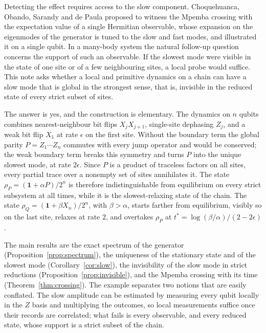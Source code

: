 \documentclass[11pt,a4paper]{article}
\theoremstyle{definition}
\theoremstyle{plain}
\newcommand{\one}{\mathbf{1}}
\begin{document}
Detecting the effect requires access to the slow component. Choquehuanca,
Obando, Sarandy and de Paula \cite{Choquehuanca2026} proposed to witness the
Mpemba crossing with the expectation value of a single Hermitian observable,
whose expansion on the eigenmodes of the generator is tuned to the slow and
fast modes, and illustrated it on a single qubit. In a many-body system the
natural follow-up question concerns the support of such an observable. If
the slowest mode were visible in the state of one site or of a few
neighbouring sites, a local probe would suffice. This note asks whether a
local and primitive dynamics on a chain can have a slow mode that is global
in the strongest sense, that is, invisible in the reduced state of every
strict subset of sites.

The answer is yes, and the construction is elementary. The dynamics on $n$
qubits combines nearest-neighbour bit flips $X_jX_{j+1}$, single-site
dephasing $Z_j$, and a weak bit flip $X_1$ at rate $\epsilon$ on the first
site. Without the boundary term the global parity $P=Z_1\cdots Z_n$ commutes
with every jump operator and would be conserved; the weak boundary term
breaks this symmetry and turns $P$ into the unique slowest mode, at rate
$2\epsilon$. Since $P$ is a product of traceless factors on all sites, every
partial trace over a nonempty set of sites annihilates it. The state
$\rho_P=(\one+\alpha P)/2^n$ is therefore indistinguishable from equilibrium
on every strict subsystem at all times, while it is the slowest-relaxing
state of the chain. The state $\rho_Q=(\one+\beta X_n)/2^n$, with
$\beta>\alpha$, starts farther from equilibrium, visibly so on the last
site, relaxes at rate $2$, and overtakes $\rho_P$ at
$t^*=\log(\beta/\alpha)/(2-2\epsilon)$.

The main results are the exact spectrum of the generator
(Proposition~\ref{prop:spectrum}), the uniqueness of the stationary state
and of the slowest mode (Corollary~\ref{cor:slow}), the invisibility of the
slow mode in strict reductions (Proposition~\ref{prop:invisible}), and the
Mpemba crossing with its time (Theorem~\ref{thm:crossing}). The example
separates two notions that are easily conflated. The slow amplitude can be
estimated by measuring every qubit locally in the $Z$ basis and multiplying
the outcomes, so local measurements suffice once their records are
correlated; what fails is every observable, and every reduced state, whose
support is a strict subset of the chain.
\end{document}
